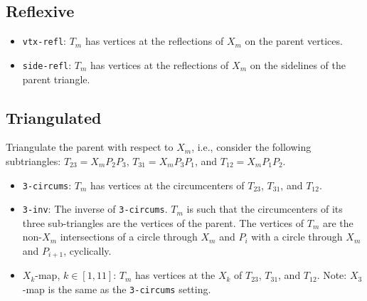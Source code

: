 \subsection{Reflexive}

\begin{itemize}
\item \texttt{vtx-refl}: $T_m$ has vertices at the reflections of $X_m$ on the parent vertices. 
\item \texttt{side-refl}: $T_m$ has vertices at the reflections of $X_m$ on the sidelines of the parent triangle.
\end{itemize}

\subsection{Triangulated}

Triangulate the parent with respect to $X_m$, i.e., consider the following subtriangles: $T_{23} = X_m P_2 P_3$, $T_{31} = X_m P_3 P_1$, and $T_{12} = X_m P_1 P_2$.

\begin{itemize}
\item \texttt{3-circums}: $T_m$ has vertices at the circumcenters of $T_{23}$, $T_{31}$, and $T_{12}$. 
\item \texttt{3-inv}: The inverse of \texttt{3-circums}. $T_m$ is such that the circumcenters of its three sub-triangles are the vertices of the parent. The vertices of $T_m$ are the non-$X_m$ intersections of a circle through $X_m$ and $P_i$ with a circle through $X_m$ and $P_{i+1}$, cyclically. 
\item $X_k$-map, $k\in[1,11]$: $T_m$ has vertices at the $X_k$ of $T_{23}$, $T_{31}$, and $T_{12}$. Note: $X_3$-map is the same as the \texttt{3-circums} setting.
\end{itemize}
